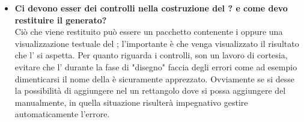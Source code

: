 \begin{itemize}
	   	 		\item
	   	 \textbf{Ci devono esser dei controlli nella costruzione del ? e come devo restituire il  generato? \\}
	   	\justifying
	   	 Ciò che viene restituito può essere un pacchetto contenente i  oppure una visualizzazione testuale del ; l'importante è che venga visualizzato il risultato che l' si aspetta. Per quanto riguarda i controlli, son un lavoro di cortesia, evitare che l' durante la fase di "disegno" faccia degli errori come ad esempio dimenticarsi il nome della  è sicuramente apprezzato. Ovviamente se si desse la possibilità di aggiungere nel  un rettangolo dove si possa aggiungere del  manualmente, in quella situazione risulterà impegnativo gestire automaticamente l'errore. 
	   	 \end{itemize}
